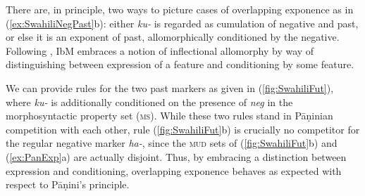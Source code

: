 \documentclass[output=paper
 	        ,biblatex
                ,babelshorthands
                ,newtxmath
                ,draftmode
                ,colorlinks, citecolor=brown
]{langscibook}
\begin{document}
\begin{exe}
\begin{xlist}
\begin{exe}
\begin{xlist}
\begin{exe}
  \ex  \label{ex:SwahiliNegFut}
  \begin{xlist}
  \end{xlist}
  \ex \label{ex:SwahiliNegPast}
  \begin{xlist}
  \end{xlist}

\end{exe}

There are, in principle, two ways to picture cases of overlapping
exponence as in (\ref{ex:SwahiliNegPast}b): either \textit{ku-} is
regarded as cumulation of negative and past, or else it is an exponent
of past, allomorphically conditioned by the negative.  Following
\citet{Carstairs87}, IbM embraces a notion of inflectional allomorphy
by way of distinguishing between expression of a feature and
conditioning by some feature.

\begin{exe}
  \ex \label{fig:SwahiliFut}
  \begin{xlist}
    \ex 
{}    \ex
{}
    
  \end{xlist}
\end{exe}

We can provide rules for the two past markers as given in
(\ref{fig:SwahiliFut}), where \textit{ku-} is additionally conditioned
on the presence of \textit{neg} in the morphosyntactic property set
(\textsc{ms}). While these two rules stand in Pāṇinian competition
with each other, rule (\ref{fig:SwahiliFut}b) is crucially no
competitor for the regular negative marker \textit{ha-}, since the
\textsc{mud} sets of (\ref{fig:SwahiliFut}b) and (\ref{ex:PanExp}a)
are actually disjoint. Thus, by embracing a distinction between
expression and conditioning, overlapping exponence behaves as expected
with respect to Pāṇini's principle.



\end{xlist}
\end{exe}
\end{xlist}
\end{exe}
\end{document}
